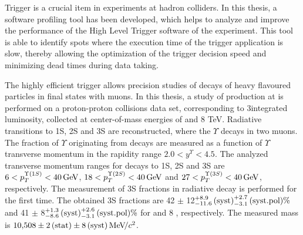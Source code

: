 Trigger is a crucial item in experiments at hadron colliders. In this thesis,  
a software profiling tool has been developed, which helps to analyze and improve the 
performance of the High Level Trigger software of the \lhcb experiment. 
This tool is able to identify spots where the execution time of the trigger application is slow, 
thereby allowing the optimization of the trigger decision speed and minimizing dead times 
during data taking. 

The highly efficient \lhcb trigger allows precision studies 
of decays of heavy flavoured particles in final states with muons.  
In this thesis, a study of \chib production at \lhcb is performed on a proton-proton collisions data set, 
corresponding to 3\invfb integrated luminosity, collected
at center-of-mass energies of  and 8 TeV. Radiative \chib transitions to
\Y1S, \Y2S and \Y3S are reconstructed, where the $\Upsilon$ decays in two muons. 
The fraction of $\Upsilon$ originating from \chib decays
are measured as a function of $\Upsilon$ transverse momentum in the \lhcb rapidity range
$2.0 < y^{\Upsilon} < 4.5$. The analyzed transverse momentum ranges for decays
to \Y1S, \Y2S and \Y3S are $6<p_T^{\Y1S}<40\gev$, $18<p_T^{\Y2S}<40\gev$ and
$27<p_T^{\Y3S}<40\gev$, respectively. The measurement of
\Y3S fractions in radiative \chibThreeP decay is performed for the first time.
The obtained \Y3S fractions are 42 $\pm$ 12\stat${}^{+8.9}_{-11.6}\mathrm{\,(syst)}^{+2.7}_{-3.1}\mathrm{\,(syst.pol)} \%$ and 41 $\pm$ 8\stat${}^{+1.3}_{-8.6}\mathrm{\,(syst)}^{+2.6}_{-3.1}\mathrm{\,(syst.pol)} \%$ for  and 8 \tev, respectively. The measured \chiboneThreeP mass is $10{,}508 \pm 2\mathrm{\,(stat)} \pm
8\mathrm{\,(syst)} {\mathrm{\,Me\kern -0.1em V\!/}c^2}$.


